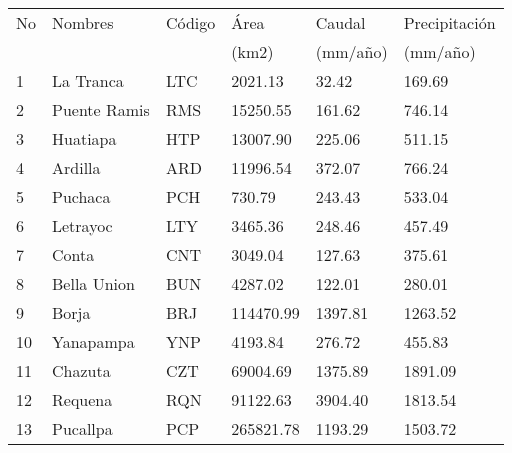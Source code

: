 \begin{table}[htb]
\label{tab:Table_q_area_basin}
\centering
\begin{tabular}{llllll}
\hline
No & Nombres      & Código & Área      & Caudal & Precipitación \\
   &              &        & (km2)       & (mm/año) & (mm/año)        \\ \hline
1  & La Tranca    & LTC    & 2021.13   & 32.42   & 169.69        \\
2  & Puente Ramis & RMS    & 15250.55  & 161.62  & 746.14        \\
3  & Huatiapa     & HTP    & 13007.90  & 225.06  & 511.15        \\
4  & Ardilla      & ARD    & 11996.54  & 372.07  & 766.24        \\
5  & Puchaca      & PCH    & 730.79    & 243.43  & 533.04        \\
6  & Letrayoc     & LTY    & 3465.36   & 248.46 & 457.49        \\
7  & Conta        & CNT    & 3049.04   & 127.63  & 375.61        \\
8  & Bella Union  & BUN    & 4287.02   & 122.01  & 280.01        \\
9  & Borja        & BRJ    & 114470.99 & 1397.81 & 1263.52       \\
10 & Yanapampa    & YNP    & 4193.84   & 276.72  & 455.83        \\
11 & Chazuta      & CZT    & 69004.69  & 1375.89 & 1891.09       \\
12 & Requena      & RQN    & 91122.63  & 3904.40 & 1813.54       \\
13 & Pucallpa     & PCP    & 265821.78 & 1193.29  & 1503.72      \\ \hline
\end{tabular}
\end{table}